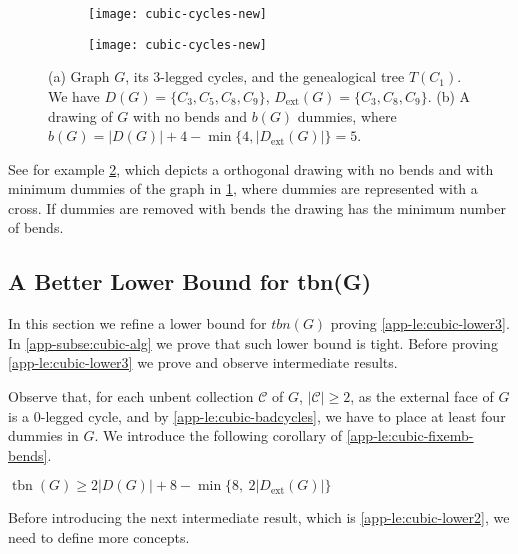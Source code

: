 \documentclass[runningheads]{llncs}
\newcommand{\tbn}{\operatorname{tbn}}
\newcommand{\ext}{\operatorname{ext}}
\begin{document}
\begin{figure}[t]
  \begin{subfigure}{0.48\textwidth}
    \centering
    \texttt{[image: cubic-cycles-new]}
    \subcaption{}
     \label{app-fig:cubic-cycles-a}
  \end{subfigure}
  \begin{subfigure}{0.48\textwidth}
    \centering
    \texttt{[image: cubic-cycles-new]}
    \subcaption{}
    \label{app-fig:cubic-cycles-b}
  \end{subfigure}
  \hfill
  \caption{(a) Graph $G$, its 3-legged cycles, and the genealogical tree $T(C_1)$. We have $D(G)=\{C_3,C_5,C_8,C_9\}$, $D_{\ext}(G)=\{C_3,C_8,C_9\}$. (b) A drawing of $G$ with no bends and $b(G)$ dummies, where $b(G)=|D(G)|+4-\min\{4, |D_{\ext}(G)|\}=5$.}
  \label{app-fig:cubic-cycles}
\end{figure}

See for example \cref{app-fig:cubic-cycles-b}, which depicts a orthogonal drawing with no bends and with minimum dummies of the graph in  \cref{app-fig:cubic-cycles-a}, where dummies are represented with a cross. If dummies are removed with bends the drawing has the minimum number of bends. %


\subsection{A Better Lower Bound for tbn(G)}
\label{app-subse:cubic-lower}

In this section we refine a lower bound for $tbn(G)$ proving \cref{app-le:cubic-lower3}. In \cref{app-subse:cubic-alg} we prove that such lower bound is tight. Before proving \cref{app-le:cubic-lower3} we prove and observe intermediate results. 

Observe that, for each unbent collection $\mathcal{C}$ of $G$, $|\mathcal{C}|\ge 2$, as the external face of $G$ is a 0-legged cycle, and by \cref{app-le:cubic-badcycles}, we have to place at least four dummies in $G$. We introduce the following corollary of \cref{app-le:cubic-fixemb-bends}.

\begin{corollary}
\label{app-co:cubic-lower1}
$\tbn(G)\ge 2|D(G)|+8-\min\{8, \ 2|D_{\ext}(G)|\}$
\end{corollary}

Before introducing the next intermediate result, which is \cref{app-le:cubic-lower2}, we need to define more concepts.
\end{document}
